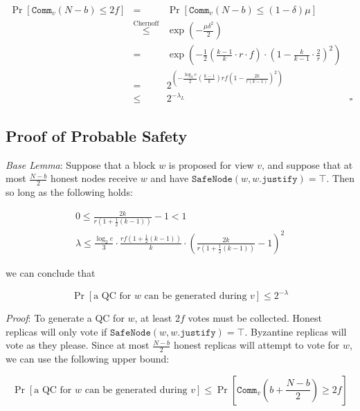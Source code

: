 \documentclass[11pt, oneside]{article}       %
\begin{document}
\[
\begin{array}{rclr}
    \Pr[\texttt{Comm}_v(N-b) \leq 2f] & = & \Pr[\texttt{Comm}_v(N-b) \leq
    (1-\delta)\mu] \\
    &\overset{\text{Chernoff}}{\leq}&
    \exp\left( -\frac{\mu\delta^2}{2}\right) \\
    &=&
         \exp\left(-\frac{1}{2}\left(\frac{k-1}{k}
         \cdot r\cdot f \right) \cdot
         \left(1-\frac{k}{k-1}\cdot \frac{2}{r}\right)^2
    \right)
    \\
    &=& 2^{\left(-\frac{\log_2 e}{2} \left(\frac{k-1}{k}\right) r f \left(1 -
    \frac{2k}{r(k-1)}\right)^2\right)} \\
    &\leq&2^{-\lambda_L} & \square
\end{array}
\]

\subsection*{Proof of Probable Safety}

\emph{Base Lemma}: Suppose that a block \(w\) is proposed for view \(v\),
and suppose that at most \(\frac{N-b}{2}\) honest nodes receive \(w\) and
have \(\texttt{SafeNode}(w,w.\texttt{justify}) = \top\). Then so long as
the following holds:

\begin{equation}\label{lemma_majority}
    \begin{array}{c}
        0 \leq \frac{2k}{r\left(1+\frac{1}{2}(k-1)\right)} - 1 < 1 \\
        \lambda \leq \frac{\log_2 e 
        }{3}\cdot\frac{rf\left(1+\frac{1}{2}(k-1)\right)}{k}\cdot
        {\left(\frac{2k}{r\left(1+\frac{1}{2}(k-1)\right)} - 1\right)}^2
    \end{array}
\end{equation}

we can conclude that

\[
    \Pr[\text{a QC for \(w\) can be generated during \(v\)}] \leq 2^{-\lambda}
\]

\emph{Proof}: To generate a QC for \(w\), at least \(2f\) votes must be
collected. Honest replicas will only vote if
\(\texttt{SafeNode}(w,w.\texttt{justify}) = \top\). Byzantine replicas will
vote as they please. Since at most \(\frac{N-b}{2}\) honest replicas will
attempt to vote for \(w\), we can use the following upper bound:

\[
    \Pr[\text{a QC for \(w\) can be generated during \(v\)}] \leq
    \Pr\left[\texttt{Comm}_v\left(b+\frac{N-b}{2}\right) \geq 2f\right]
\]
\end{document}
